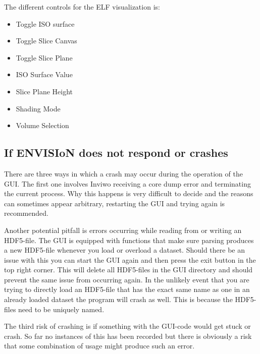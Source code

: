 The different controls for the ELF visualization is:
\begin{itemize}
  \item Toggle ISO surface
  \item Toggle Slice Canvas
  \item Toggle Slice Plane
  \item ISO Surface Value
  \item Slice Plane Height
  \item Shading Mode
  \item Volume Selection
\end{itemize}

\subsection{If ENVISIoN does not respond or crashes}
There are three ways in which a crash may occur during the operation of the GUI. The first one involves Inviwo receiving a core dump error and terminating the current process. Why this happens is very difficult to decide and the reasons can sometimes appear arbitrary, restarting the GUI and trying again is recommended.

Another potential pitfall is errors occurring while reading from or writing an HDF5-file. The GUI is equipped with functions that make sure parsing produces a new HDF5-file whenever you load or overload a dataset. Should there be an issue with this you can start the GUI again and then press the exit button in the top right corner. This will delete all HDF5-files in the GUI directory and should prevent the same issue from occurring again. In the unlikely event that you are trying to directly load an HDF5-file that has the exact same name as one in an already loaded dataset the program will crash as well. This is because the HDF5-files need to be uniquely named.

The third risk of crashing is if something with the GUI-code would get stuck or crash. So far no instances of this has been recorded but there is obviously a risk that some combination of usage might produce such an error. 